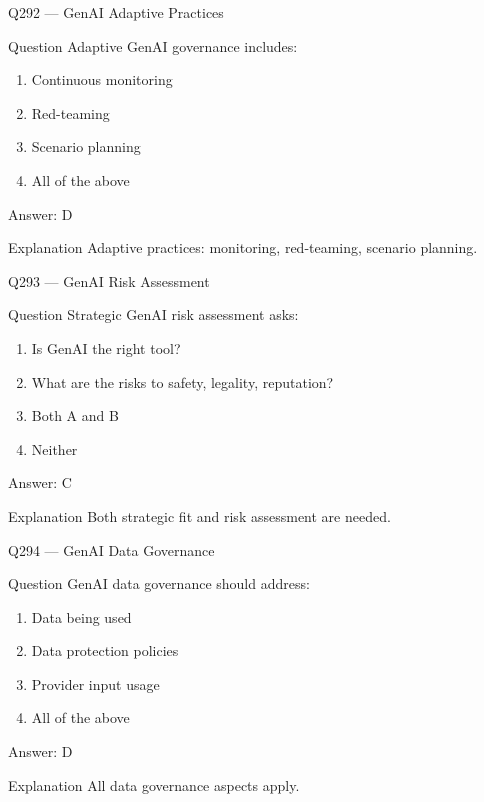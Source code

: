 \documentclass[aspectratio=169,8pt]{beamer}
\begin{document}
\begin{frame}{Q292 --- GenAI Adaptive Practices}
\begin{block}{Question}
	Adaptive GenAI governance includes:
	\begin{enumerate}
		\item Continuous monitoring
		\item Red-teaming
		\item Scenario planning
		\item All of the above
	\end{enumerate}
\end{block}
\begin{exampleblock}{Answer: D}\end{exampleblock}
\begin{block}{Explanation}
	Adaptive practices: monitoring, red-teaming, scenario planning.
\end{block}
\end{frame}

\begin{frame}{Q293 --- GenAI Risk Assessment}
\begin{block}{Question}
	Strategic GenAI risk assessment asks:
	\begin{enumerate}
		\item Is GenAI the right tool?
		\item What are the risks to safety, legality, reputation?
		\item Both A and B
		\item Neither
	\end{enumerate}
\end{block}
\begin{exampleblock}{Answer: C}\end{exampleblock}
\begin{block}{Explanation}
	Both strategic fit and risk assessment are needed.
\end{block}
\end{frame}

\begin{frame}{Q294 --- GenAI Data Governance}
\begin{block}{Question}
	GenAI data governance should address:
	\begin{enumerate}
		\item Data being used
		\item Data protection policies
		\item Provider input usage
		\item All of the above
	\end{enumerate}
\end{block}
\begin{exampleblock}{Answer: D}\end{exampleblock}
\begin{block}{Explanation}
	All data governance aspects apply.
\end{block}
\end{frame}
\end{document}
